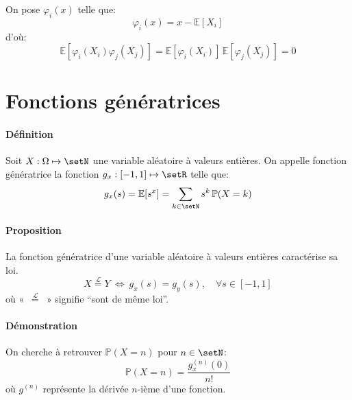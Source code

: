\documentclass[a4paper,10pt,french,openany]{memoir}
\newcommand{\Proba}{\mathbb{P}}
\newcommand{\Esper}{\mathbb{E}}
\newcommand{\laweq}{\overset{\mathcal L}=}
\begin{document}
On pose $\varphi_i(x)$ telle que:
\[\varphi_i(x) = x - \Esper[X_i]\]
d'où:
\[\Esper[\varphi_i(X_i) \varphi_j(X_j)] = \Esper[\varphi_i(X_i)] \, \Esper[\varphi_j(X_j)] = 0\]

\section{Fonctions génératrices}

\paragraph{Définition}
Soit $X: \Omega \mapsto \setN$ une variable aléatoire à valeurs entières. On appelle fonction génératrice la fonction $g_x:[-1,1]\mapsto\setR$ telle que:
\[g_x(s)=\Esper[s^x]=\sum_{k\in \setN} s^k\,\Proba(X=k)\]

\paragraph{Proposition}
La fonction génératrice d'une variable aléatoire à valeurs entières caractérise sa loi.
\[ X \laweq Y \:\Leftrightarrow\: g_x(s)=g_y(s), \quad\forall s\in [-1,1] \]
où «~$\laweq$~» signifie ``sont de même loi''.

\paragraph{Démonstration}
On cherche à retrouver $\Proba(X=n)$ pour $n\in \setN$:
\[ \Proba(X=n)=\frac{g_x^{(n)}(0)}{n!} \]
où $g^{(n)}$ représente la dérivée $n$-ième d'une fonction.
\end{document}
